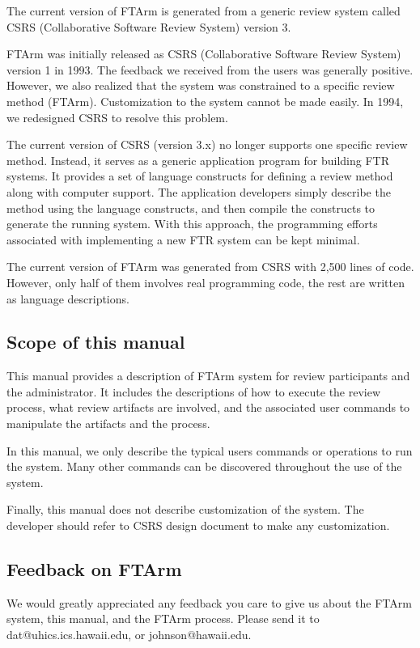 The current version of FTArm is generated from a generic review system
called CSRS (Collaborative Software Review System) version 3. 

FTArm was initially released as CSRS (Collaborative Software Review
System) version 1 in 1993. The feedback we received from the users
was generally positive. However, we also realized that the system was
constrained to a specific review method (FTArm). Customization to the
system cannot be made easily.
In 1994, we redesigned CSRS to resolve this problem.  

The current version of CSRS (version 3.x) no longer supports one specific
review method. 
Instead, it serves as a generic application program for building FTR systems.
It provides a set of language constructs for defining a review method
along with computer support.
The application developers simply
describe the method using the language constructs, and then compile
the constructs to generate the running system.
With this approach, the programming efforts associated with
implementing a new FTR system can be kept minimal.

The current version of FTArm was generated from CSRS with 2,500 lines
of code. However, only half of them involves real programming code, the
rest are written as language descriptions. 

\subsection {Scope of this manual}
This manual provides a description of FTArm system for
review participants and the administrator. It includes the
descriptions of 
how to execute the review process, what review
artifacts are involved, and the associated user commands to
manipulate the artifacts and the process. 

In this manual, we only describe the typical users commands or
operations to run the system. Many other commands can be discovered
throughout the use of the system. 

Finally, this manual does not describe customization of the
system. The developer should refer to CSRS design document to make
any customization. 

\subsection {Feedback on FTArm}
We would greatly appreciated any feedback you care to give us about
the FTArm system, this manual, and the FTArm process. Please send it
to dat@uhics.ics.hawaii.edu, or johnson@hawaii.edu.

